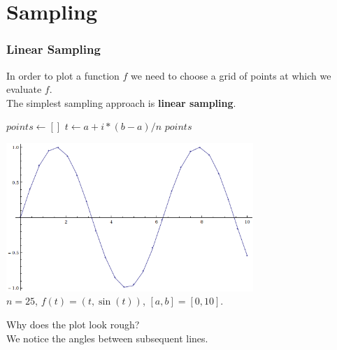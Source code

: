 \documentclass{beamer}
\begin{document}
\section{Sampling}
\begin{frame}
\frametitle{Linear Sampling}
In order to plot a function $f$ we need to choose a grid of points at which we evaluate $f$. \\ \vspace{0.2cm}
The simplest sampling approach is {\bf linear sampling}. \vspace{0.5cm}
\footnotesize
\begin{algorithmic}[1]
\State $points \gets []$
\State $t \gets a + i * (b-a) / n$
\State {}
\EndFor
\State \Return $points$
\EndFunction
\end{algorithmic}%
\normalsize
\end{frame}


\begin{frame}
\begin{center}
  \includegraphics[width=0.7\textwidth]{sinlinear.png} \\
  $n = 25$, $f(t) = (t, \sin(t))$, $[a,b] = [0,10]$. \\ \vspace{0.2cm}
\end{center}
Why does the plot look rough?  \\ \vspace{0.2cm}
We notice the angles between subsequent lines.
\end{frame}
\end{document}
